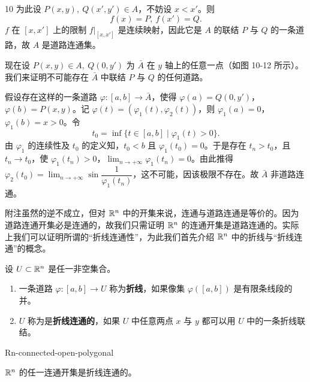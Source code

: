 \begin{sourceexample}{10}
为此设 $P(x,y),\ Q(x',y')\in A$，不妨设 $x<x'$。则
\[f(x)=P,\ f(x')=Q.\]
$f$ 在 $[x,x']$ 上的限制 $f|_{[x,x']}$ 是连续映射，因此它是 $A$ 的联结 $P$ 与 $Q$ 的一条道路，故 $A$ 是道路连通集。

现在设 $P(x,y)\in A,\ Q(0,y')$ 为 $\bar{A}$ 在 $y$ 轴上的任意一点（如图 10-12 所示）。我们来证明不可能存在 $\bar{A}$ 中联结 $P$ 与 $Q$ 的任何道路。

假设存在这样的一条道路 $\varphi:[a,b]\to\bar{A}$，使得 $\varphi(a)=Q(0,y')$，$\varphi(b)=P(x,y)$。记 $\varphi(t)=(\varphi_1(t),\varphi_2(t))$，则 $\varphi_1(a)=0$，$\varphi_1(b)=x>0$。令
\[t_0=\inf\{t\in[a,b]\mid\varphi_1(t)>0\}.\]
由 $\varphi_1$ 的连续性及 $t_0$ 的定义知，$t_0<b$ 且 $\varphi_1(t_0)=0$。于是存在 $t_n>t_0$，且 $t_n\to t_0$，使 $\varphi_1(t_n)>0$，$\displaystyle\lim_{n\to+\infty}\varphi_1(t_n)=0$。由此推得 $\varphi_2(t_0)=\displaystyle\lim_{n\to+\infty}\sin\dfrac{1}{\varphi_1(t_n)}$，这不可能，因该极限不存在。故 $\bar{A}$ 非道路连通。

\end{sourceexample}

附注\quad 虽然的逆不成立，但对 $\mathbb{R}^n$ 中的开集来说，连通与道路连通是等价的。因为道路连通开集必是连通的，故我们只需证明 $\mathbb{R}^n$ 的连通开集是道路连通的。实际上我们可以证明所谓的“折线连通性”，为此我们首先介绍 $\mathbb{R}^n$ 中的折线与“折线连通”的概念。

\begin{mydef*}{}

设 $U\subset\mathbb{R}^n$ 是任一非空集合。

\begin{enumerate}[label=\arabic{enumi})]
\item 一条道路 $\varphi:[a,b]\to U$ 称为\textbf{折线}，如果像集 $\varphi([a,b])$ 是有限条线段的并。
\item $U$ 称为是\textbf{折线连通的}，如果 $U$ 中任意两点 $x$ 与 $y$ 都可以用 $U$ 中的一条折线联结。
\end{enumerate}

\end{mydef*}

\begin{mythm}{}{Rn-connected-open-polygonal}

$\mathbb{R}^n$ 的任一连通开集是折线连通的。

\end{mythm}

